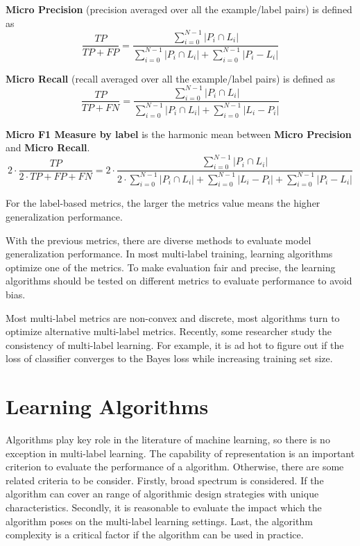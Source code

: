 \textbf{Micro Precision} (precision averaged over all the example/label pairs) is defined as
\begin{equation}\label{eq:MicroPrecision}
\frac{TP}{TP + FP}=\frac{\sum_{i=0}^{N-1} \left|P_i \cap L_i\right|}
          {\sum_{i=0}^{N-1} \left|P_i \cap L_i\right| + \sum_{i=0}^{N-1} \left|P_i - L_i\right|}
\end{equation}

\textbf{Micro Recall} (recall averaged over all the example/label pairs) is defined as
\begin{equation}\label{eq:MicroRecall}
\frac{TP}{TP + FN}=\frac{\sum_{i=0}^{N-1} \left|P_i \cap L_i\right|}
        {\sum_{i=0}^{N-1} \left|P_i \cap L_i\right| + \sum_{i=0}^{N-1} \left|L_i - P_i\right|}
\end{equation}

\textbf{Micro F1 Measure by label} is the harmonic mean between \textbf{Micro Precision} and \textbf{Micro Recall}. 
\begin{equation}\label{eq:LabelMicroAccuracy}
2 \cdot \frac{TP}{2 \cdot TP + FP + FN}=2 \cdot \frac{\sum_{i=0}^{N-1} \left|P_i \cap L_i\right|}{2 \cdot
        \sum_{i=0}^{N-1} \left|P_i \cap L_i\right| + \sum_{i=0}^{N-1} \left|L_i - P_i\right| + \sum_{i=0}^{N-1}
        \left|P_i - L_i\right|}
\end{equation}

For the label-based metrics, the larger the metrics value means the higher generalization performance.

With the previous metrics, there are diverse methods to evaluate model generalization performance. In most multi-label training, learning algorithms optimize one of the metrics. To make evaluation fair and precise, the learning algorithms should be tested on different metrics to evaluate performance to avoid bias.

Most multi-label metrics are non-convex and discrete, most algorithms turn to optimize alternative multi-label metrics. Recently, some researcher study the consistency of multi-label learning\citep{gao2013consistency}. For example, it is ad hot to figure out if the loss of classifier converges to the Bayes loss while increasing training set size.


\section{Learning Algorithms}

Algorithms play key role in the literature of machine learning, so there is no exception in multi-label learning. The capability of representation is an important criterion to evaluate the performance of a algorithm. Otherwise, there are some related criteria to be consider. Firstly, broad spectrum is considered. If the algorithm can cover an range of algorithmic design strategies with unique characteristics. Secondly, it is reasonable to evaluate the impact which the algorithm poses on the multi-label learning settings. Last, the algorithm complexity is a critical factor if the algorithm can be used in practice.

